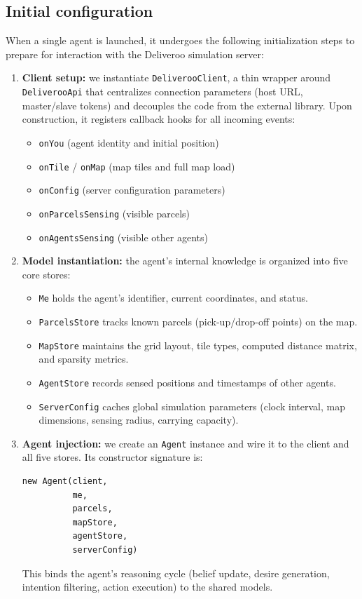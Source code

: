 \subsection{Initial configuration}

When a single agent is launched, it undergoes the following initialization steps to prepare for interaction with the Deliveroo simulation server:

\begin{enumerate}
  \item \textbf{Client setup:} we instantiate \texttt{DeliverooClient}, a thin wrapper around \texttt{DeliverooApi} that centralizes connection parameters (host URL, master/slave tokens) and decouples the code from the external library. Upon construction, it registers callback hooks for all incoming events:
    \begin{itemize}
      \item \texttt{onYou} (agent identity and initial position)  
      \item \texttt{onTile} / \texttt{onMap} (map tiles and full map load)  
      \item \texttt{onConfig} (server configuration parameters)  
      \item \texttt{onParcelsSensing} (visible parcels)  
      \item \texttt{onAgentsSensing} (visible other agents)  
    \end{itemize}

  \item \textbf{Model instantiation:} the agent’s internal knowledge is organized into five core stores:
    \begin{itemize}
      \item \texttt{Me} holds the agent’s identifier, current coordinates, and status.  
      \item \texttt{ParcelsStore} tracks known parcels (pick-up/drop-off points) on the map.  
      \item \texttt{MapStore} maintains the grid layout, tile types, computed distance matrix, and sparsity metrics.  
      \item \texttt{AgentStore} records sensed positions and timestamps of other agents.  
      \item \texttt{ServerConfig} caches global simulation parameters (clock interval, map dimensions, sensing radius, carrying capacity).
    \end{itemize}

  \item \textbf{Agent injection:} we create an \texttt{Agent} instance and wire it to the client and all five stores. Its constructor signature is:
    \begin{verbatim}
new Agent(client,
          me,
          parcels,
          mapStore,
          agentStore,
          serverConfig)
\end{verbatim}
    This binds the agent’s reasoning cycle (belief update, desire generation, intention filtering, action execution) to the shared models.


\end{enumerate}
